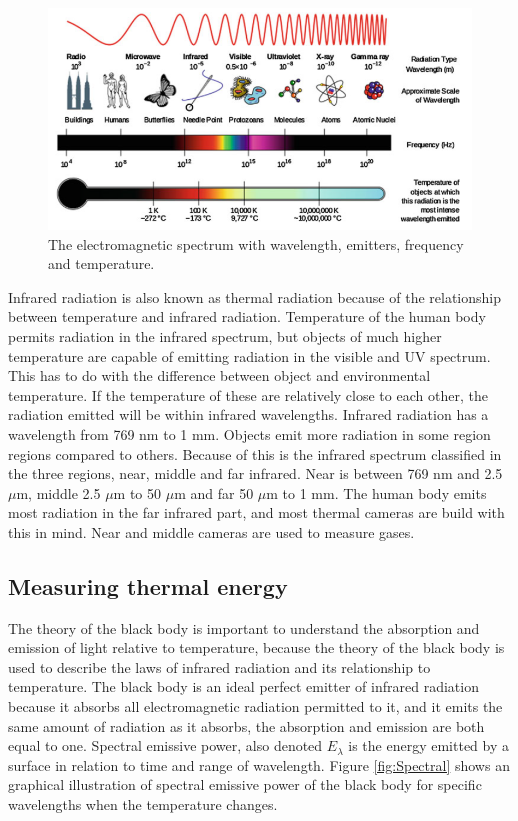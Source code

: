 \begin{figure}[H]                                         
	\includegraphics[width=.66\textwidth]{figures/em_spectrum}  
	\caption{The electromagnetic spectrum with wavelength, emitters, frequency and temperature.\cite{ignacio2017}}
	\label{fig:em_spectrum}  
\end{figure}   

Infrared radiation is also known as thermal radiation because of the relationship between temperature and infrared radiation. Temperature of the human body permits radiation in the infrared spectrum, but objects of much higher temperature are capable of emitting radiation in the visible and UV spectrum. This has to do with the difference between object and environmental temperature. If the temperature of these are relatively close to each other, the radiation emitted will be within infrared wavelengths. Infrared radiation has a wavelength from 769 nm to 1 mm. Objects emit more radiation in some region regions compared to others. Because of this is the infrared spectrum classified in the three regions, near, middle and far infrared. Near is between 769 nm and 2.5 $\mu$m, middle 2.5 $\mu$m to 50 $\mu$m and far 50 $\mu$m to 1 mm. The human body emits most radiation in the far infrared part, and most thermal cameras are build with this in mind. Near and middle cameras are used to measure gases.\cite{ignacio2017} 


\subsection{Measuring thermal energy}

The theory of the black body is important to understand the absorption and emission of light relative to temperature, because the theory of the black body is used to describe the laws of infrared radiation and its relationship to temperature. The black body is an ideal perfect emitter of infrared radiation because it absorbs all electromagnetic radiation permitted to it, and it emits the same amount of radiation as it absorbs, the absorption and emission are both equal to one. 
Spectral emissive power, also denoted $E_\lambda$ is the energy emitted by a surface in relation to time and range of wavelength. Figure \ref{fig:Spectral} shows an graphical illustration of spectral emissive power of the black body for specific wavelengths when the temperature changes. \cite{ignacio2017} 

